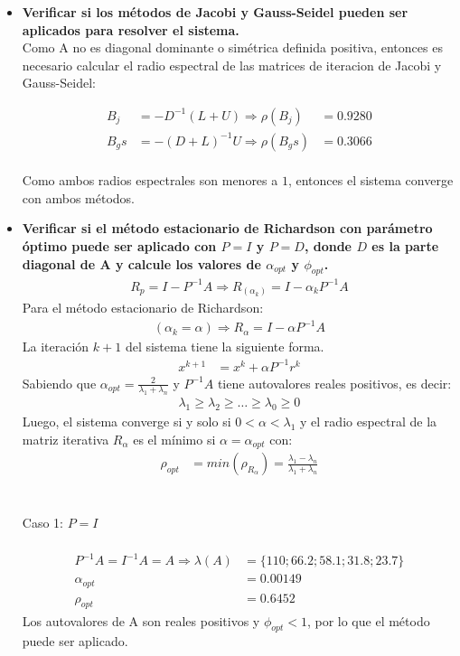 \begin{itemize}

\item \textbf{Verificar si los métodos de Jacobi y Gauss-Seidel pueden ser aplicados para resolver el sistema.}\\
Como A no es diagonal dominante o simétrica definida positiva, entonces es necesario calcular el radio espectral de las matrices de iteracion de Jacobi y Gauss-Seidel:

\begin{align}
    B_j  &= -D^{-1}(L+U)  \Rightarrow \rho(B_j) &= 0.9280 \\
    B_gs &= -(D+L)^{-1}U  \Rightarrow \rho(B_gs)&= 0.3066
\end{align}~\\
Como ambos radios espectrales son menores a $1$, entonces el sistema converge con ambos métodos.

\item \textbf{Verificar si el método estacionario de Richardson con parámetro óptimo puede ser aplicado con $P=I$ y $P=D$, donde $D$ es la parte diagonal de A y calcule los valores de $\alpha_{opt}$ y  $\phi_{opt}$.}\\
\begin{align}
    R_p = I - P^{-1}A \Rightarrow R_{(\alpha_k)} = I - \alpha_k P^{-1}A
\end{align}
Para el método estacionario de Richardson:
\begin{align}
(\alpha_k = \alpha) \Rightarrow R_{\alpha} = I - \alpha P^{-1} A  
\end{align}
La iteración $k+1$ del sistema tiene la siguiente forma.
\begin{align}
    x^{k+1} &= x^k + \alpha P^{-1} r^k
\end{align}
Sabiendo que $\alpha_{opt} = \frac{2}{\lambda_1 + \lambda_n}$ y $P^{-1}A$ tiene autovalores reales positivos, es decir:
\begin{align}
    \lambda_1 \geq \lambda_2 \geq \dots \geq \lambda_0 \geq 0
\end{align}
Luego, el sistema converge si y solo si $0 < \alpha < \lambda_1$ y el radio espectral de la matriz iterativa $R_{\alpha}$ es el mínimo si $\alpha = \alpha_{opt}$ con:
\begin{align}
    \rho_{opt} &= min(\rho_{R_{\alpha}}) = \frac{\lambda_1 - \lambda_n}{\lambda_1 + \lambda_n}
\end{align}~\\\\
Caso 1: $P = I$\\\\
\begin{align}
    P^{-1}A = I^{-1}A = A \Rightarrow \lambda(A) &= \{110;66.2;58.1;31.8;23.7\} \\
    \alpha_{opt} &= 0.00149 \\
    \rho_{opt} &= 0.6452
\end{align}
Los autovalores de A son reales positivos y $\phi_{opt} < 1$, por lo que el método puede ser aplicado.\\\\


\end{itemize}
